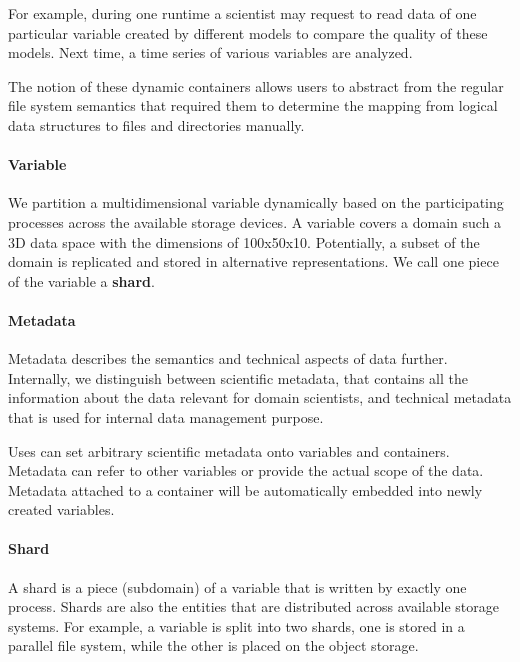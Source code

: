 \documentclass{../../template/esiwace-report}
\begin{document}
For example, during one runtime a scientist may request to read data of one particular variable created by different models to compare the quality of these models. 
Next time, a time series of various variables are analyzed.

The notion of these dynamic containers allows users to abstract from the regular file system semantics that required them to determine the mapping from logical data structures to files and directories manually.



\paragraph{Variable}

We partition a multidimensional variable dynamically based on the participating processes across the available storage devices.
A variable covers a domain such a 3D data space with the dimensions of 100x50x10.
Potentially, a subset of the domain is replicated and stored in alternative representations.
We call one piece of the variable a \textbf{shard}.

\paragraph{Metadata}

Metadata describes the semantics and technical aspects of data further.
Internally, we distinguish between scientific metadata, that contains all the information about the data relevant for domain scientists, and technical metadata that is used for internal data management purpose.

Uses can set arbitrary scientific metadata onto variables and containers.
Metadata can refer to other variables or provide the actual scope of the data.
Metadata attached to a container will be automatically embedded into newly created variables.

\paragraph{Shard}

A shard is a piece (subdomain) of a variable that is written by exactly one process.
Shards are also the entities that are distributed across available storage systems.
For example, a variable is split into two shards, one is stored in a parallel file system, while the other is placed on the object storage.
\end{document}
